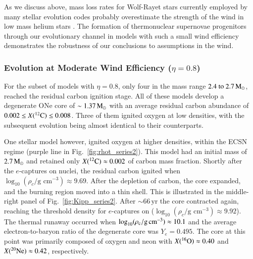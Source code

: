 \documentclass[main.tex]{subfiles}
\begin{document}
As we discuss above, mass loss rates for Wolf-Rayet stars currently employed by many stellar 
evolution codes probably overestimate the strength of the wind in low mass helium stars 
\citep[e.g.,][]{Vink:2017ujd, Sanders:2020:mnras}. The formation of thermonuclear supernovae 
progenitors through our evolutionary channel in models with such a small wind efficiency 
demonstrates the robustness of our conclusions to assumptions in the wind. 


\subsubsection{Evolution at Moderate Wind Efficiency ($\eta = 0.8$)}\label{sec:ch2:eta_0p8_evolution}

For the subset of models with $\eta=0.8$, only four in the mass range $\numrange{2.4}{2.7}\msun$, reached the residual carbon ignition stage. All of these models develop a degenerate ONe core of $\sim 1.37\msun$ with an average residual carbon abundance of $0.002 \leq X(\iso{C}{12}) \leq 0.008$. Three of them ignited oxygen at low densities, with the subsequent evolution being  almost identical to their \seriesone counterparts. 

One stellar model however, ignited oxygen at higher densities, within the ECSN regime (purple line in Fig.~\ref{fig:rhot_series2}). This model had an initial mass of $2.7\msun$ and retained only $X(\iso{C}{12}) \approx 0.002$ of carbon mass fraction. Shortly after the $e$-captures on  nuclei, the residual carbon ignited  when $\log_{10} (\rho_c / \text{g cm}^{-3}) \approx 9.69$. After the depletion of carbon, the core expanded, and the burning region moved into a thin shell. This is illustrated in the middle-right panel of Fig.~\ref{fig:Kipp_series2}.
After $\sim 66\,\text{yr}$ the core contracted  again, reaching the threshold density for $e$-captures on  ($\log_{10} (\rho_c / \text{g cm}^{-3}) \approx 9.92$). The thermal runaway occurred when $\logrhoc \approx 10.1$ and the average electron-to-baryon ratio of the degenerate core was  $Y_e = 0.495$. The core at this point was primarily composed of oxygen and neon with $X(\iso{O}{16}) \approx 0.40$ and $X(\iso{Ne}{20}) \approx 0.42$, respectively.
\end{document}
